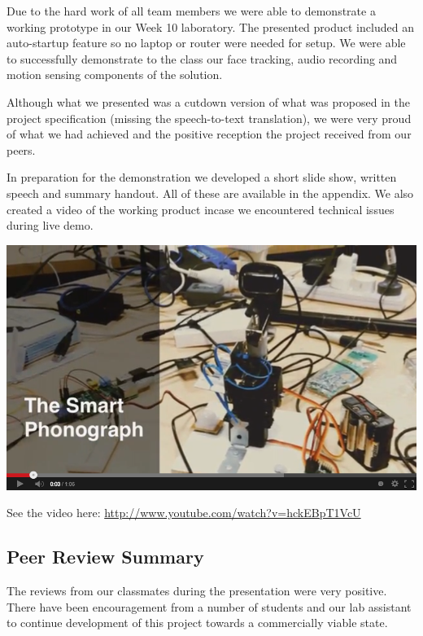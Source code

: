 \documentclass[11pt,a4paper,titlepage]{report}
\begin{document}
Due to the hard work of all team members we were able to demonstrate a working prototype in our Week 10 laboratory. The presented product included an auto-startup feature so no laptop or router were needed for setup. We were able to successfully demonstrate to the class our face tracking, audio recording and motion sensing components of the solution. 

Although what we presented was a cutdown version of what was proposed in the project specification (missing the speech-to-text translation), we were very proud of what we had achieved and the positive reception the project received from our peers.

In preparation for the  demonstration we developed a short slide show, written speech and summary handout. All of these are available in the appendix. We also created a video of the working product incase we encountered technical issues during live demo. 

\begin{center}
\href{http://www.youtube.com/watch?v=hckEBpT1VcU}{
    \includegraphics[width=\textwidth]{graphs/youtube.png}
}
\end{center}
See the video here: \url{http://www.youtube.com/watch?v=hckEBpT1VcU}



\subsection{Peer Review Summary}

The reviews from our classmates during the presentation were very positive. There have been encouragement from a number of students and our lab assistant to continue development of this project towards a commercially viable state. 
\end{document}
